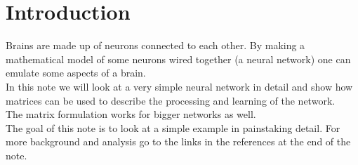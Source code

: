 \documentclass{article}
\title{\normalfont{Back propagation in a simple neural net}}
\begin{document}
\maketitle
\section*{Introduction}
Brains are made up of neurons connected to each other. By making a mathematical model of some neurons wired together (a neural network) one can emulate some aspects of a brain.
\\
In this note we will look at a very simple neural network in detail and show how matrices can be used to describe the processing and learning of the network.
\\The matrix formulation works for bigger networks as well.
\\
The goal of this note is to look at a simple example in painstaking detail. For more background and analysis go to the links in the references at the end of the note.
\\
\\
\end{document}
